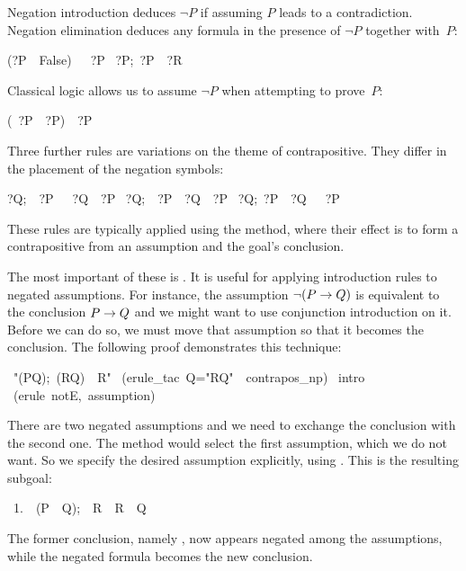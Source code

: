 Negation introduction deduces $\neg P$ if assuming $P$ leads to a 
contradiction. Negation elimination deduces any formula in the 
presence of $\neg P$ together with~$P$: 
\begin{isabelle}
(?P\ \isasymLongrightarrow\ False)\ \isasymLongrightarrow\ \isasymnot\ ?P%
\isanewline
\isasymlbrakk{\isasymnot}\ ?P;\ ?P\isasymrbrakk\ \isasymLongrightarrow\ ?R%
\end{isabelle}
%
Classical logic allows us to assume $\neg P$ 
when attempting to prove~$P$: 
\begin{isabelle}
(\isasymnot\ ?P\ \isasymLongrightarrow\ ?P)\ \isasymLongrightarrow\ ?P%
\end{isabelle}
%
Three further rules are variations on the theme of contrapositive. 
They differ in the placement of the negation symbols: 
\begin{isabelle}
\isasymlbrakk?Q;\ \isasymnot\ ?P\ \isasymLongrightarrow\ \isasymnot\ ?Q\isasymrbrakk\ \isasymLongrightarrow\ ?P%
\isanewline
\isasymlbrakk{\isasymnot}\ ?Q;\ \isasymnot\ ?P\ \isasymLongrightarrow\ ?Q\isasymrbrakk\ \isasymLongrightarrow\ ?P%
\isanewline
\isasymlbrakk{\isasymnot}\ ?Q;\ ?P\ \isasymLongrightarrow\ ?Q\isasymrbrakk\ \isasymLongrightarrow\ \isasymnot\ ?P%
\end{isabelle}
%
These rules are typically applied using the {} method, where 
their effect is to form a contrapositive from an 
assumption and the goal's conclusion.  

The most important of these is .  It is useful
for applying introduction rules to negated assumptions.  For instance, 
the assumption $\neg(P\rightarrow Q)$ is equivalent to the conclusion $P\rightarrow Q$ and we 
might want to use conjunction introduction on it. 
Before we can do so, we must move that assumption so that it 
becomes the conclusion. The following proof demonstrates this 
technique: 
\begin{isabelle}
\ "\isasymlbrakk{\isasymnot}(P{\isasymlongrightarrow}Q);\
\isasymnot(R{\isasymlongrightarrow}Q)\isasymrbrakk\ \isasymLongrightarrow\
R"\isanewline
{}\ (erule_tac\ Q="R{\isasymlongrightarrow}Q"\ \
contrapos_np)\isanewline
{}\ intro\isanewline
\isacommand{apply}\ (erule\ notE,\ assumption)\isanewline
\isacommand{done}
\end{isabelle}
%
There are two negated assumptions and we need to exchange the conclusion with the
second one.  The method  would select the first assumption,
which we do not want.  So we specify the desired assumption explicitly, using
\isa{erule_tac}.  This is the resulting subgoal: 
\begin{isabelle}
\ 1.\ \isasymlbrakk{\isasymnot}\ (P\ \isasymlongrightarrow\ Q);\ \isasymnot\
R\isasymrbrakk\ \isasymLongrightarrow\ R\ \isasymlongrightarrow\ Q%
\end{isabelle}
The former conclusion, namely , now appears negated among the assumptions,
while the negated formula \isa{R\ \isasymlongrightarrow\ Q} becomes the new
conclusion.

